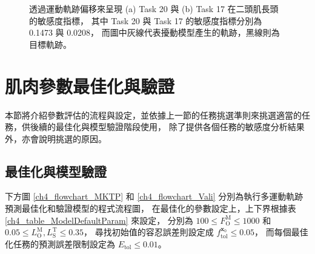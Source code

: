 \begin{figure}[!ht]
	\centering
    \caption[呈現敏感度指標於運動軌跡偏移範例]{透過運動軌跡偏移來呈現 (a) Task 20 與 (b) Task 17 在二頭肌長頭的敏感度指標，
                                            其中 Task 20 與 Task 17 的敏感度指標分別為 0.1473 與 0.0208，                                      
                                            而圖中灰線代表擾動模型產生的軌跡，黑線則為目標軌跡。}
    \label{ch4_fig_SAExample}
\end{figure}

\section{肌肉參數最佳化與驗證}
本節將介紹參數評估的流程與設定，並依據上一節的任務挑選準則來挑選適當的任務，供後續的最佳化與模型驗證階段使用，
除了提供各個任務的敏感度分析結果外，亦會說明挑選的原因。

\subsection{最佳化與模型驗證}
下方圖 \ref{ch4_flowchart_MKTP} 和 \ref{ch4_flowchart_Vali} 分別為執行多運動軌跡預測最佳化和驗證模型的程式流程圖，
在最佳化的參數設定上，上下界根據表 \ref{ch4_table_ModelDefaultParam} 來設定，
分別為 $100 \leq F^\mathrm{M}_\mathrm{O} \leq 1000$ 和 $0.05 \leq L^\mathrm{M}_\mathrm{O},L^\mathrm{T}_\mathrm{S} \leq 0.35$，
尋找初始值的容忍誤差則設定成 $f^{\mathbf{x}_0}_\mathrm{tol} \leq 0.05$，
而每個最佳化任務的預測誤差限制設定為 $E_\mathrm{tol} \leq 0.01$。

